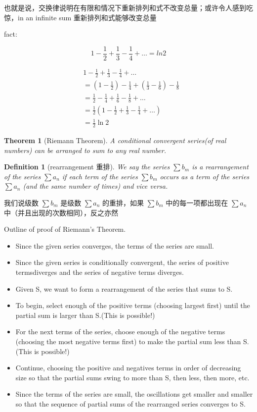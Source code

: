 \documentclass{ctexart}
\newtheorem{theorem}{Theorem}
\newtheorem{definition}{Definition}
\begin{document}
也就是说，交换律说明在有限和情况下重新排列和式不改变总量；或许令人感到吃惊，in an infinite sum 重新排列和式能够改变总量

fact:

\[1 - \frac{1}{2} + \frac{1}{3} - \frac{1}{4} + \dots = ln2 \]

\begin{align*}
 & 1 - \frac{1}{2} + \frac{1}{3} - \frac{1}{4} + \dots  \\
&= (1 - \frac{1}{2}) - \frac{1}{4} + (\frac{1}{3} - \frac{1}{6}) - \frac{1}{8} \\
&= \frac{1}{2} - \frac{1}{4} + \frac{1}{6} - \frac{1}{8} + \dots \\
&= \frac{1}{2} \left(1 - \frac{1}{2} + \frac{1}{3} - \frac{1}{4} + \dots\right) \\
&= \frac{1}{2} \ln 2
\end{align*}

\begin{theorem}[Riemann Theorem]

A conditional convergent series(of real numbers) can be arranged to sum to any real number.

\end{theorem}

\begin{definition}[rearrangement 重排]
We say the series \( \sum b_m \) is a rearrangement of the series \( \sum a_n \) if each
term of the series \( \sum b_m \) occurs as a term of the series \( \sum a_n \) (and the same
number of times) and vice versa.
\end{definition}

我们说级数 \( \sum b_m \) 是级数 \( \sum a_n \) 的重排，如果 \( \sum b_m \) 中的每一项都出现在 \( \sum a_n \) 中（并且出现的次数相同），反之亦然

Outline of proof of Riemann’s Theorem.

\begin{itemize}
\item Since the given series converges, the terms of the series are small.
\item Since the given series is conditionally convergent, the series of positive termsdiverges and the series of negative terms diverges. 
\item Given S, we want to form a rearrangement of the series that sums to S.
\item To begin, select enough of the positive terms (choosing largest first) until the partial sum is larger than S.(This is possible!) 
\item For the next terms of the series, choose enough of the negative terms (choosing the most negative terms first) to make the partial sum less than S. (This is possible!) 
\item Continue, choosing the positive and negatives terms in order of decreasing size so that the partial sums swing to more than S, then less, then more, etc. 
\item Since the terms of the series are small, the oscillations get smaller and smaller so that the sequence of partial sums of the rearranged series converges to S. 
\end{itemize}
\end{document}
